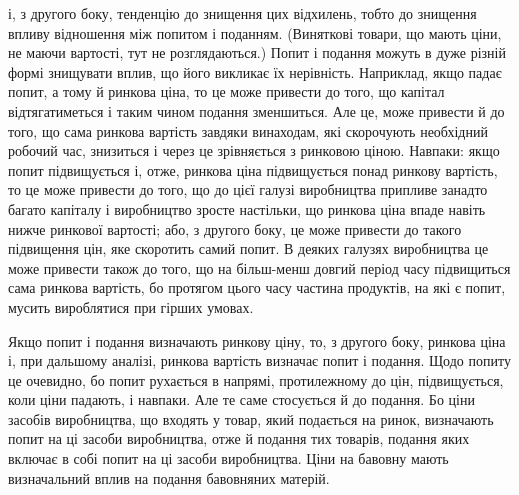 \parcont{}  %
і, з другого боку, тенденцію до знищення цих відхилень, тобто
до знищення впливу відношення між попитом і поданням. (Виняткові
товари, що мають ціни, не маючи вартості, тут не розглядаються.)
Попит і подання можуть в дуже різній формі
знищувати вплив, що його викликає їх нерівність. Наприклад,
якщо падає попит, а тому й ринкова ціна, то це може привести
до того, що капітал відтягатиметься і таким чином подання
зменшиться. Але це, може привести й до того, що сама ринкова
вартість завдяки винаходам, які скорочують необхідний робочий
час, знизиться і через це зрівняється з ринковою ціною. Навпаки:
якщо попит підвищується і, отже, ринкова ціна підвищується
понад ринкову вартість, то це може привести до того,
що до цієї галузі виробництва припливе занадто багато капіталу
і виробництво зросте настільки, що ринкова ціна впаде
навіть нижче ринкової вартості; або, з другого боку, це може
привести до такого підвищення цін, яке скоротить самий попит.
В деяких галузях виробництва це може привести також до
того, що на більш-менш довгий період часу підвищиться сама
ринкова вартість, бо протягом цього часу частина продуктів,
на які є попит, мусить вироблятися при гірших умовах.

Якщо попит і подання визначають ринкову ціну, то, з другого
боку, ринкова ціна і, при дальшому аналізі, ринкова вартість
визначає попит і подання. Щодо попиту це очевидно, бо
попит рухається в напрямі, протилежному до цін, підвищується,
коли ціни падають, і навпаки. Але те саме стосується й до
подання. Бо ціни засобів виробництва, що входять у товар, який
подається на ринок, визначають попит на ці засоби виробництва,
отже й подання тих товарів, подання яких включає в собі
попит на ці засоби виробництва. Ціни на бавовну мають визначальний
вплив на подання бавовняних матерій.

